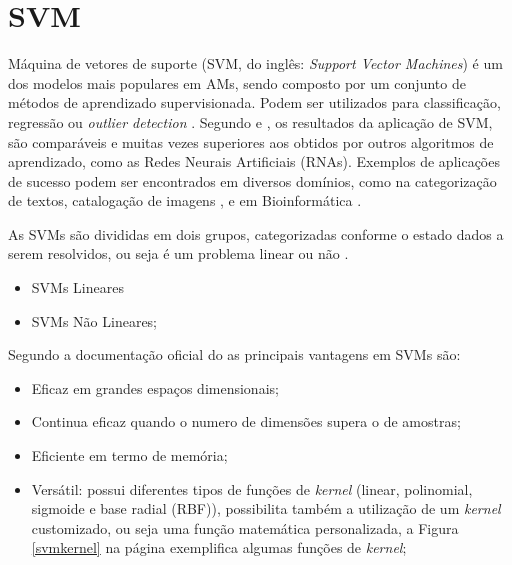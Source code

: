 \section{SVM}

Máquina de vetores de suporte (SVM, do inglês: \textit{Support Vector Machines}) é um dos modelos mais populares em AMs, sendo composto por um conjunto de métodos de aprendizado supervisionada. Podem ser utilizados para classificação, regressão ou \textit{outlier detection} \cite{scikit-learn}. Segundo  e , os resultados da aplicação de SVM, são comparáveis e muitas vezes superiores aos obtidos por outros algoritmos de aprendizado, como as Redes Neurais Artificiais (RNAs). Exemplos de aplicações de sucesso podem ser encontrados em diversos domínios, como na categorização de textos,  catalogação de imagens \cite{pontil1998support}, e em Bioinformática \cite{noble2004support}.

As SVMs são divididas em dois grupos, categorizadas conforme o estado dados a serem resolvidos, ou seja é um problema linear ou não \cite{lorena2007introduccao}.
\begin{itemize}
    \item SVMs Lineares
    \item SVMs Não Lineares;
\end{itemize}

Segundo a documentação oficial do  as principais vantagens em SVMs são:

\begin{itemize}
    \item Eficaz em grandes espaços dimensionais;
    \item Continua eficaz quando o numero de dimensões supera o de amostras;
    \item Eficiente em termo de memória;
    \item Versátil: possui diferentes tipos de funções de \textit{kernel} (linear, polinomial, sigmoide e base radial (RBF)), possibilita também a utilização de um \textit{kernel} customizado, ou seja uma função matemática personalizada, a Figura \ref{svmkernel} na página \pageref{svmkernel} exemplifica algumas funções de \textit{kernel};
\end{itemize}

